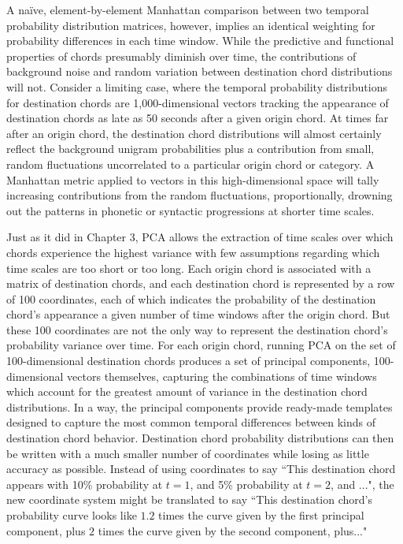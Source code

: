 A na\"{i}ve, element-by-element Manhattan comparison between two temporal probability distribution matrices, however, implies an identical weighting for probability differences in each time window.  While the predictive and functional properties of chords presumably diminish over time, the contributions of background noise and random variation between destination chord distributions will not.  Consider a limiting case, where the temporal probability distributions for destination chords are 1,000-dimensional vectors tracking the appearance of destination chords as late as 50 seconds after a given origin chord.  At times far after an origin chord, the destination chord distributions will almost certainly reflect the background unigram probabilities plus a contribution from small, random fluctuations uncorrelated to a particular origin chord or category.  A Manhattan metric applied to vectors in this high-dimensional space will tally increasing contributions from the random fluctuations, proportionally, drowning out the patterns in phonetic or syntactic progressions at shorter time scales.

Just as it did in Chapter 3, PCA allows the extraction of time scales over which chords experience the highest variance with few assumptions regarding which time scales are too short or too long.  Each origin chord is associated with a matrix of destination chords, and each destination chord is represented by a row of 100 coordinates, each of which indicates the probability of the destination chord's appearance a given number of time windows after the origin chord.  But these 100 coordinates are not the only way to represent the destination chord's probability variance over time.  For each origin chord, running PCA on the set of 100-dimensional destination chords produces a set of principal components, 100-dimensional vectors themselves, capturing the combinations of time windows which account for the greatest amount of variance in the destination chord distributions.  In a way, the principal components provide ready-made templates designed to capture the most common temporal differences between kinds of destination chord behavior.  Destination chord probability distributions can then be written with a much smaller number of coordinates while losing as little accuracy as possible.  Instead of using coordinates to say ``This destination chord appears with 10\% probability at $t=1$, and 5\% probability at $t=2$, and ...", the new coordinate system might be translated to say ``This destination chord's probability curve looks like $1.2$ times the curve given by the first principal component, plus $2$ times the curve given by the second component, plus..."

